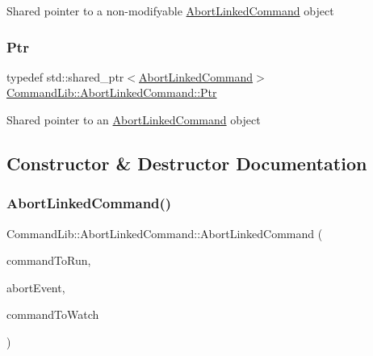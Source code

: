 Shared pointer to a non-\/modifyable \mbox{\hyperlink{class_command_lib_1_1_abort_linked_command}{Abort\+Linked\+Command}} object

\mbox{\label{class_command_lib_1_1_abort_linked_command_acb916ab386f796250b4978538d9eabd8}} 
\subsubsection{\texorpdfstring{Ptr}{Ptr}}
{\footnotesize\ttfamily typedef std\+::shared\+\_\+ptr$<$\mbox{\hyperlink{class_command_lib_1_1_abort_linked_command}{Abort\+Linked\+Command}}$>$ \mbox{\hyperlink{class_command_lib_1_1_abort_linked_command_acb916ab386f796250b4978538d9eabd8}{Command\+Lib\+::\+Abort\+Linked\+Command\+::\+Ptr}}}



Shared pointer to an \mbox{\hyperlink{class_command_lib_1_1_abort_linked_command}{Abort\+Linked\+Command}} object



\subsection{Constructor \& Destructor Documentation}
\mbox{\label{class_command_lib_1_1_abort_linked_command_a0141b7dda2d5927ea405c888876224ec}} 
\subsubsection{\texorpdfstring{Abort\+Linked\+Command()}{AbortLinkedCommand()}}
{\footnotesize\ttfamily Command\+Lib\+::\+Abort\+Linked\+Command\+::\+Abort\+Linked\+Command (\begin{DoxyParamCaption}\item[{\mbox{\hyperlink{class_command_lib_1_1_command_a3b3e4f00144373299df5c6bb1acc319d}{Command\+::\+Ptr}}}]{command\+To\+Run,  }\item[{\mbox{\hyperlink{class_command_lib_1_1_waitable_ac74b6b91e48220146eada76a31cf2d9b}{Waitable\+::\+Ptr}}}]{abort\+Event,  }\item[{\mbox{\hyperlink{class_command_lib_1_1_command_aee8fd78ff853a1f9c8e56959c3e81811}{Command\+::\+Const\+Ptr}}}]{command\+To\+Watch }\end{DoxyParamCaption})\hspace{0.3cm}{\ttfamily [protected]}}



